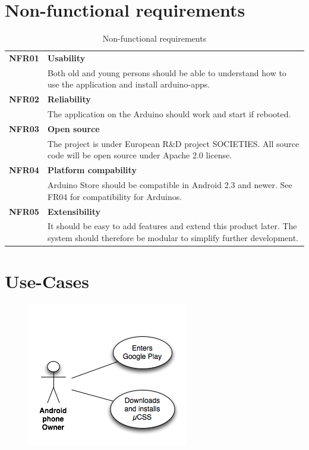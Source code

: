 \section{Non-functional requirements}
\begin{table}[H]
\begin{tabularx}{\linewidth}{lX}
\textbf{NFR01} & \textbf{Usability}\\
 & Both old and young persons should be able to understand how to use the application and install arduino-apps.\\
\textbf{NFR02} & \textbf{Reliability}\\
 & The application on the Arduino should work and start if rebooted.\\
\textbf{NFR03} & \textbf{Open source}\\
 & The project is under European R\&D project SOCIETIES. All source code will be open source under Apache 2.0 license.\\
\textbf{NFR04} & \textbf{Platform compability}\\
 & Arduino Store should be compatible in Android 2.3 and newer. See FR04 for compatibility for Arduinos.\\
\textbf{NFR05} & \textbf{Extensibility}\\
 & It should be easy to add features and extend this product later. The system should therefore be modular to simplify further development.\\
\end{tabularx}
\caption{Non-functional requirements}
\end{table}


\section{Use-Cases}
\begin{figure}[H]
\centering
\includegraphics[scale=1]{images/UseCase1}
\end{figure}

